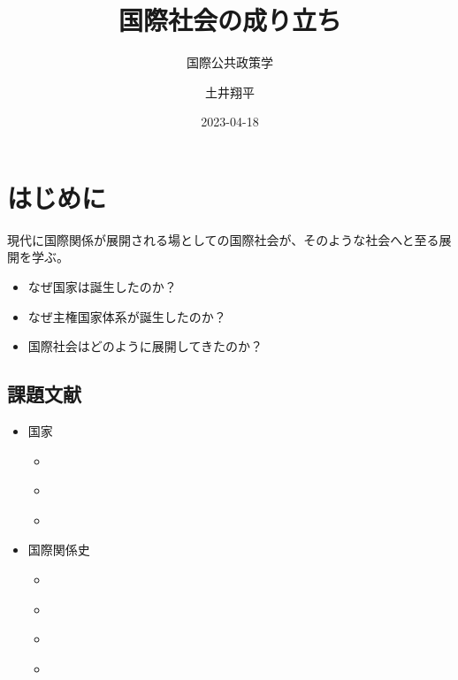 \documentclass[
  xelatex,
  ja=standard]{bxjsarticle}
\title{国際社会の成り立ち}
\subtitle{国際公共政策学}
\author{土井翔平}
\date{2023-04-18}
\providecommand{\tightlist}{%
  \setlength{\itemsep}{0pt}\setlength{\parskip}{0pt}}\usepackage{longtable,booktabs,array}
\begin{document}
\maketitle
\ifdefined\Shaded\renewenvironment{Shaded}{\begin{tcolorbox}[borderline west={3pt}{0pt}{shadecolor}, boxrule=0pt, sharp corners, enhanced, interior hidden, breakable, frame hidden]}{\end{tcolorbox}}\fi

\hypertarget{ux306fux3058ux3081ux306b}{%
\section*{はじめに}\label{ux306fux3058ux3081ux306b}}

現代に国際関係が展開される場としての国際社会が、そのような社会へと至る展開を学ぶ。

\begin{itemize}
\tightlist
\item
  なぜ国家は誕生したのか？
\item
  なぜ主権国家体系が誕生したのか？
\item
  国際社会はどのように展開してきたのか？
\end{itemize}

\hypertarget{ux8ab2ux984cux6587ux732e}{%
\subsection*{課題文献}\label{ux8ab2ux984cux6587ux732e}}

\begin{itemize}
\tightlist
\item
  国家

  \begin{itemize}
  \tightlist
  \item
    \citet[第2章]{sunahara2020}
  \item
    \citet[第2章]{kubo2016}
  \item
    \citet[第1章]{kasuya2014}
  \end{itemize}
\item
  国際関係史

  \begin{itemize}
  \tightlist
  \item
    \citet[第1章 (unit 1-5)]{murata2023}
  \item
    \citet[第2章]{nakanishi2013}
  \item
    \citet{ogawa2018}
  \item
    \citet[第1-4章]{yamakage2012}
  \end{itemize}
\end{itemize}
\end{document}
